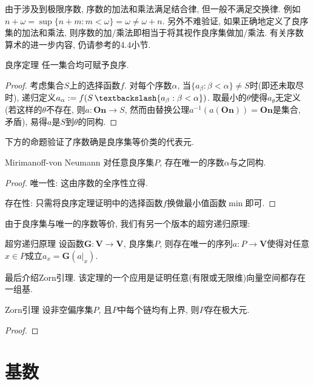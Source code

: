 由于涉及到极限序数, 序数的加法和乘法满足结合律, 但一般不满足交换律. 例如$n+\omega = \sup \{ n+m:m<\omega \}=\omega \neq \omega +n$. 另外不难验证, 如果正确地定义了良序集的加法和乘法, 则序数的加/乘法即相当于将其视作良序集做加/乘法. 有关序数算术的进一步内容, 仍请参考\cite{set_theory_Hao}的4.4小节. 


\begin{theorem}{良序定理}
	任一集合均可赋予良序. 
\end{theorem}
\begin{proof}
	考虑集合$S$上的选择函数$f$. 对每个序数$\alpha$, 当$\{ a_{\beta}:\beta < \alpha \} \neq S$时(即还未取尽时), 递归定义$a_{\alpha} := f(S \setjianfa \{ a_{\beta}:\beta < \alpha \})$. 取最小的$\theta$使得$a_{\theta}$无定义(若这样的$\theta$不存在, 则$a:\mathbf{On} \to S$, 然而由替换公理$a^{-1}(a(\mathbf{On})) = \mathbf{On}$是集合, 矛盾), 易得$a$是$S$到$\theta$的同构. 
\end{proof}

下方的命题验证了序数确是良序集等价类的代表元. 

\begin{proposition}{Mirimanoff-von Neumann}
	对任意良序集$P$, 存在唯一的序数$\alpha$与之同构. 
\end{proposition}
\begin{proof}
	唯一性: 这由序数的全序性立得. 
	
	存在性: 只需将良序定理证明中的选择函数$f$换做最小值函数$\min$即可. 
\end{proof}

由于良序集与唯一的序数等价, 我们有另一个版本的超穷递归原理: 

\begin{corollary}{超穷递归原理}
	设函数$\mathbf{G}:\mathbf{V} \to \mathbf{V}$, 良序集$P$, 则存在唯一的序列$a:P \to \mathbf{V}$使得对任意$x \in P$成立$a_{x} = \mathbf{G}(a|_{x})$. 
\end{corollary}

最后介绍Zorn引理. 该定理的一个应用是证明任意(有限或无限维)向量空间都存在一组基. 

\begin{theorem}{Zorn引理}
	设非空偏序集$P$, 且$P$中每个链均有上界, 则$P$存在极大元. 
\end{theorem}
\begin{proof}
	
\end{proof}



\section{基数}

